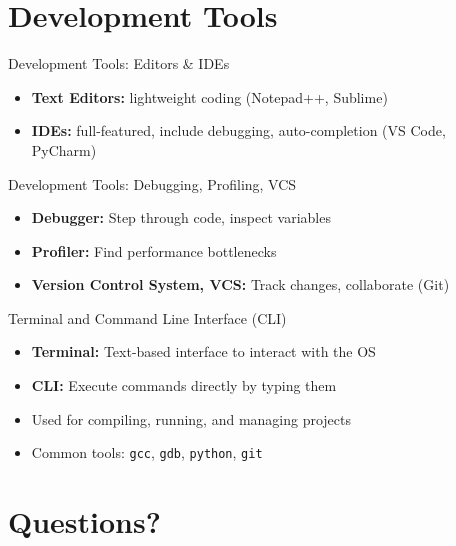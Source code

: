\documentclass[12pt, aspectratio=169]{beamer}
\begin{document}
    \section{Development Tools}


    \begin{frame}{Development Tools: Editors \& IDEs}
        \begin{itemize}
            \item \textbf{Text Editors:} lightweight coding (Notepad++, Sublime)
            \item \textbf{IDEs:} full-featured, include debugging, auto-completion (VS Code, PyCharm)
        \end{itemize}
    \end{frame}


    \begin{frame}{Development Tools: Debugging, Profiling, VCS}
        \begin{itemize}
            \item \textbf{Debugger:} Step through code, inspect variables
            \item \textbf{Profiler:} Find performance bottlenecks
            \item \textbf{Version Control System, VCS:} Track changes, collaborate (Git)
        \end{itemize}
    \end{frame}


    \begin{frame}{Terminal and Command Line Interface (CLI)}
        \begin{itemize}
            \item \textbf{Terminal:} Text-based interface to interact with the OS
            \item \textbf{CLI:} Execute commands directly by typing them
            \item Used for compiling, running, and managing projects
            \item Common tools: \texttt{gcc}, \texttt{gdb}, \texttt{python}, \texttt{git}
        \end{itemize}
    \end{frame}


    \section*{Questions?}
\end{document}
